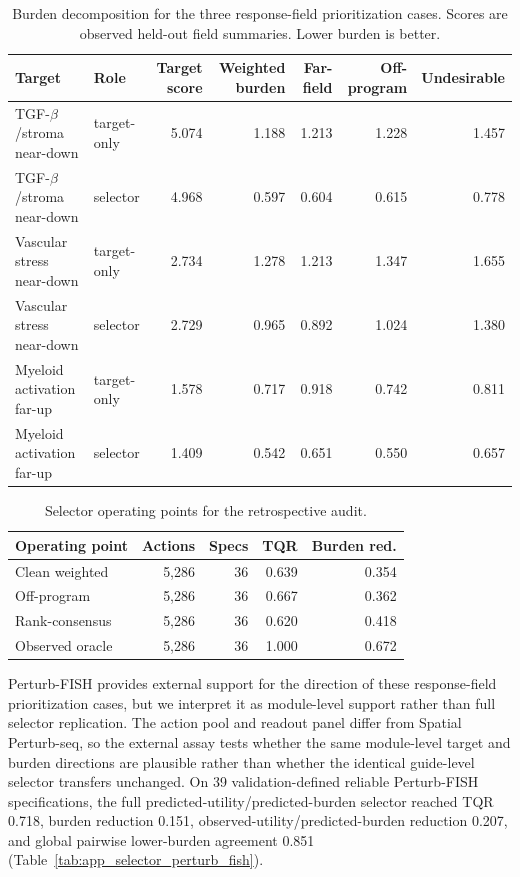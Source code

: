 \documentclass[sigconf,review,balance=false]{acmart}
\begin{document}
\begin{table}[t]
\centering
\small
\caption{Burden decomposition for the three response-field prioritization cases. Scores are observed held-out field summaries. Lower burden is better.}
\label{tab:app_selector_burden_decomposition}
\begin{tabular}{llrrrrr}
\toprule
Target & Role & Target score & Weighted burden & Far-field & Off-program & Undesirable \\
\midrule
TGF-$\beta$/stroma near-down & target-only & 5.074 & 1.188 & 1.213 & 1.228 & 1.457 \\
TGF-$\beta$/stroma near-down & selector & 4.968 & 0.597 & 0.604 & 0.615 & 0.778 \\
Vascular stress near-down & target-only & 2.734 & 1.278 & 1.213 & 1.347 & 1.655 \\
Vascular stress near-down & selector & 2.729 & 0.965 & 0.892 & 1.024 & 1.380 \\
Myeloid activation far-up & target-only & 1.578 & 0.717 & 0.918 & 0.742 & 0.811 \\
Myeloid activation far-up & selector & 1.409 & 0.542 & 0.651 & 0.550 & 0.657 \\
\bottomrule
\end{tabular}
\end{table}

\begin{table}[t]
\centering
\small
\caption{Selector operating points for the retrospective audit.}
\label{tab:app_selector_operating_points}
\setlength{\tabcolsep}{4pt}
\begin{tabular}{@{}lrrrr@{}}
\toprule
Operating point & Actions & Specs & TQR & Burden red. \\
\midrule
Clean weighted & 5,286 & 36 & 0.639 & 0.354 \\
Off-program & 5,286 & 36 & 0.667 & 0.362 \\
Rank-consensus & 5,286 & 36 & 0.620 & 0.418 \\
Observed oracle & 5,286 & 36 & 1.000 & 0.672 \\
\bottomrule
\end{tabular}
\end{table}

Perturb-FISH provides external support for the direction of these
response-field prioritization cases, but we interpret it as module-level
support rather than full selector replication. The action pool and readout
panel differ from Spatial Perturb-seq, so the external assay tests whether the
same module-level target and burden directions are plausible rather than
whether the identical guide-level selector transfers unchanged. On 39
validation-defined reliable Perturb-FISH specifications, the full
predicted-utility/predicted-burden selector reached TQR 0.718, burden reduction
0.151, observed-utility/predicted-burden reduction 0.207, and global
pairwise lower-burden agreement 0.851
(Table~\ref{tab:app_selector_perturb_fish}).
\end{document}
